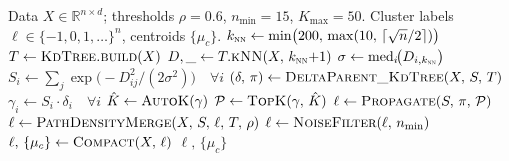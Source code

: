 

\begin{algorithm}[t]
\caption{\textsc{TRCC\_Fit} — full clustering pipeline (v1.1)}
\label{alg:trcc_fit}
\begin{algorithmic}[1]
\Require Data $X \in \mathbb{R}^{n\times d}$; thresholds $\rho{=}0.6$, $n_{\min}{=}15$, $K_{\max}{=}50$.
\Ensure  Cluster labels $\ell \in \{-1, 0, 1, \dots\}^n$, centroids $\{\mu_c\}$.
\State $k_{\textsc{nn}} \gets \min\bigl(200,\,\max(10,\,\lceil\sqrt{n}/2\rceil)\bigr)$ 
\State $T \gets \textsc{KdTree.build}(X)$ 
\State $D, \_ \gets T.\textsc{kNN}(X,\, k_{\textsc{nn}}{+}1)$ 
\State $\sigma \gets \operatorname{med}_i\!\bigl(D_{i,k_{\textsc{nn}}}\bigr)$
\State $S_i \gets \sum_{j} \exp\!\bigl(-D_{ij}^{2}/(2\sigma^{2})\bigr) \quad \forall i$ 
\State $(\delta,\,\pi) \gets \textsc{DeltaParent\_KdTree}(X,\,S,\,T)$ 
\State $\gamma_i \gets S_i \cdot \delta_i \quad \forall i$
\State $\hat K \gets \textsc{AutoK}(\gamma)$ 
\State $\mathcal{P} \gets \textsc{TopK}(\gamma,\,\hat K)$ 
\State $\ell \gets \textsc{Propagate}(S,\,\pi,\,\mathcal{P})$ 
\State $\ell \gets \textsc{PathDensityMerge}(X,\,S,\,\ell,\,T,\,\rho)$ 
\State $\ell \gets \textsc{NoiseFilter}(\ell,\,n_{\min})$ 
\State $\ell,\,\{\mu_c\} \gets \textsc{Compact}(X,\,\ell)$ 
\State \Return $\ell,\,\{\mu_c\}$
\end{algorithmic}
\end{algorithm}



